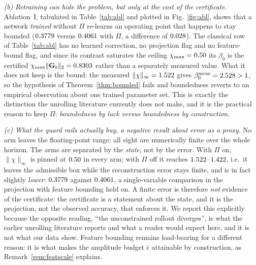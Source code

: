 \documentclass[journal,cmes,article,submit,moreauthors,pdftex]{Definitions/tsp}
\newcommand{\norm}[1]{\lVert #1 \rVert}
\newcommand{\infn}[1]{\lVert #1 \rVert_{\infty}}
\newcommand{\numv}[1]{#1}
\begin{document}
\emph{(b) Retraining can hide the problem, but only at the cost of the certificate.} Ablation~I, tabulated in Table~\ref{tab:abl} and plotted in Fig.~\ref{fig:abl}, shows that a network \emph{trained} without $\Pi$
re-learns an operating point that happens to
stay bounded ($\numv{\NumAblUncPOffFbOnRre}$ versus $\numv{\NumAblUncPOnFbOnRre}$ with $\Pi$, a
difference of $\numv{\NumAblProjDelta}$). The classical row of Table~\ref{tab:abl} has no learned correction, no projection flag and no feature-bound flag, and since its contrast saturates the ceiling $\chi_{\max}=\numv{\chimax}$ its $\beta_0$ is the certified $\chi_{\max}\norm{\mathbf{G}_b}_2=\numv{\betacert}$ rather than a separately measured value. What it does not keep is the bound: the measured
$\infn{\chi}=\numv{\NumAblUncPOffFbOnChi}$ gives $\beta_0^{\mathrm{meas}}=\numv{\NumBetaMeas}>1$, so
the hypothesis of Theorem~\ref{thm:bounded} fails and boundedness reverts to an empirical
observation about one trained parameter set. This is exactly the distinction the unrolling
literature currently does not make, and it is the practical reason to keep $\Pi$:
\emph{boundedness by luck versus boundedness by construction}.

\emph{(c) What the guard rails actually buy, a negative result about error as a proxy.} No
arm leaves the floating-point range: all eight are numerically finite over the whole horizon.
The arms are separated by the \emph{state}, not by the error. With $\Pi$ on, $\infn{\chi}$ is pinned
at $\numv{\chimax}$ in every arm; with $\Pi$ off it reaches
$\numv{\NumAblUncPOffFbOnChi}$--$\numv{\NumAblUncPOffFbOffChi}$, i.e.\ it leaves the admissible
box while the reconstruction error stays finite, and is in fact slightly \emph{lower}: $\numv{\NumAblUncPOffFbOnRre}$ against $\numv{\NumAblUncPOnFbOnRre}$, a single-variable comparison in the projection with feature bounding held on. A finite error is
therefore \emph{not} evidence of the certificate: the certificate is a statement about the
state, and it is the projection, not the observed accuracy, that enforces it. We report this
explicitly because the opposite reading, ``the unconstrained rollout diverges'', is what
the earlier unrolling literature reports and what a reader would expect here, and it is not
what our data show. Feature bounding remains load-bearing for a different reason: it is what
makes the amplitude budget $\bar\epsilon$ attainable by construction, as Remark~\ref{rem:featscale} explains.
\end{document}
